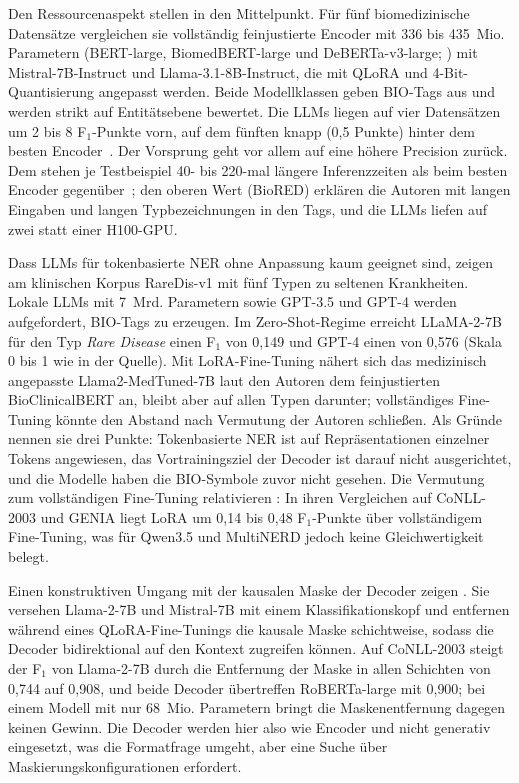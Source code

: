 Den Ressourcenaspekt stellen \textcite{obeidat2025llm} in den
Mittelpunkt.
Für fünf biomedizinische Datensätze vergleichen sie vollständig feinjustierte Encoder mit
336 bis 435~Mio. Parametern (BERT-large, BiomedBERT-large und
DeBERTa-v3-large; \cite[Abschn.~II-B]{obeidat2025llm}) mit
Mistral-7B-Instruct und Llama-3.1-8B-Instruct, die mit QLoRA und
4-Bit-Quantisierung angepasst werden.
Beide Modellklassen geben BIO-Tags aus und werden strikt auf
Entitätsebene bewertet.
Die LLMs liegen auf vier Datensätzen um 2 bis 8 F$_1$-Punkte vorn, auf
dem fünften knapp (0{,}5 Punkte) hinter dem besten
Encoder~\cite[Tab.~III]{obeidat2025llm}.
Der Vorsprung geht vor allem auf eine höhere Precision zurück.
Dem stehen je Testbeispiel 40- bis 220-mal längere Inferenzzeiten als
beim besten Encoder gegenüber~\cite[Abschn.~III--IV, Tab.~IV]{obeidat2025llm};
den oberen Wert (BioRED) erklären die Autoren mit langen Eingaben und
langen Typbezeichnungen in den Tags, und die LLMs liefen auf zwei statt
einer H100-GPU.

Dass LLMs für tokenbasierte NER ohne Anpassung kaum geeignet sind, zeigen
\textcite{lu2024llmstruggle} am klinischen Korpus RareDis-v1 mit fünf
Typen zu seltenen Krankheiten.
Lokale LLMs mit 7~Mrd. Parametern sowie GPT-3.5 und GPT-4 werden
aufgefordert, BIO-Tags zu erzeugen.
Im Zero-Shot-Regime erreicht LLaMA-2-7B für den Typ \emph{Rare Disease}
einen F$_1$ von 0{,}149 und GPT-4 einen von 0{,}576 (Skala 0 bis 1 wie
in der Quelle).
Mit LoRA-Fine-Tuning nähert sich das medizinisch angepasste
Llama2-MedTuned-7B laut den Autoren dem feinjustierten
BioClinicalBERT an, bleibt aber auf allen Typen darunter; vollständiges
Fine-Tuning könnte den Abstand nach Vermutung der Autoren schließen.
Als Gründe nennen sie drei Punkte: Tokenbasierte NER ist auf
Repräsentationen einzelner Tokens angewiesen, das Vortrainingsziel der
Decoder ist darauf nicht ausgerichtet, und die Modelle haben die
BIO-Symbole zuvor nicht gesehen.
Die Vermutung zum vollständigen Fine-Tuning relativieren
\textcite[Anh.~D, Tab.~11]{zhan2026generativeNER}:
In ihren Vergleichen auf CoNLL-2003 und GENIA liegt LoRA um 0{,}14 bis
0{,}48 F$_1$-Punkte über vollständigem Fine-Tuning, was für Qwen3.5 und
MultiNERD jedoch keine Gleichwertigkeit belegt.

Einen konstruktiven Umgang mit der kausalen Maske der Decoder zeigen
\textcite{dukic2024lookingright}.
Sie versehen Llama-2-7B und Mistral-7B mit einem Klassifikationskopf und
entfernen während eines
QLoRA-Fine-Tunings die kausale Maske schichtweise, sodass
die Decoder bidirektional auf den Kontext zugreifen können.
Auf CoNLL-2003 steigt der F$_1$ von Llama-2-7B durch die Entfernung der
Maske in allen Schichten von 0{,}744 auf 0{,}908, und beide Decoder
übertreffen RoBERTa-large mit 0{,}900; bei einem Modell mit nur 68~Mio.
Parametern bringt die Maskenentfernung dagegen keinen Gewinn.
Die Decoder werden hier also wie Encoder und nicht generativ eingesetzt,
was die Formatfrage umgeht, aber eine Suche über
Maskierungskonfigurationen erfordert.


